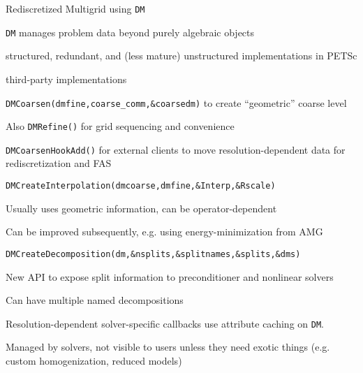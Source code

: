 \begin{frame}{Rediscretized Multigrid using \texttt{DM}}
  \begin{itemize}
{\scriptsize
  \item \texttt{DM} manages problem data beyond purely algebraic objects
    \begin{itemize}
{\scriptsize
    \item structured, redundant, and (less mature) unstructured implementations in PETSc
    \item third-party implementations
}
    \end{itemize}
  \item \texttt{DMCoarsen(dmfine,coarse\_comm,\&coarsedm)} to create ``geometric'' coarse level
    \begin{itemize}
{\scriptsize
    \item Also \texttt{DMRefine()} for grid sequencing and convenience
    \item \texttt{DMCoarsenHookAdd()} for external clients to move resolution-dependent data for rediscretization and FAS
}
    \end{itemize}
  \item \texttt{DMCreateInterpolation(dmcoarse,dmfine,\&Interp,\&Rscale)}
    \begin{itemize}
{\scriptsize
    \item Usually uses geometric information, can be operator-dependent
    \item Can be improved subsequently, e.g. using energy-minimization from AMG
}
    \end{itemize}
  \item \texttt{DMCreateDecomposition(dm,\&nsplits,\&splitnames,\&splits,\&dms)}
    \begin{itemize}
{\scriptsize
    \item New API to expose split information to preconditioner and nonlinear solvers
    \item Can have multiple named decompositions
}
    \end{itemize}
  \item Resolution-dependent solver-specific callbacks use attribute caching on \texttt{DM}.
    \begin{itemize}
{\scriptsize
    \item Managed by solvers, not visible to users unless they need exotic things (e.g. custom homogenization, reduced models)
}
    \end{itemize}
}
  \end{itemize}
\end{frame}
